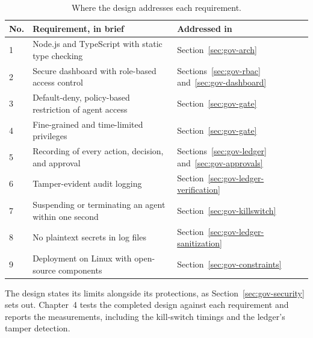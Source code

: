 \begin{table}[htbp]
\centering
\caption{Where the design addresses each requirement.}
\label{tab:gov-requirement-map}
\small
\begin{tabular}{@{}p{}>{\raggedright\arraybackslash}p{}>{\raggedright\arraybackslash}p{}@{}}
\toprule
\textbf{No.} & \textbf{Requirement, in brief} & \textbf{Addressed in} \\
\midrule
1 & Node.js and TypeScript with static type checking &
Section~\ref{sec:gov-arch} \\
2 & Secure dashboard with role-based access control &
Sections~\ref{sec:gov-rbac} and~\ref{sec:gov-dashboard} \\
3 & Default-deny, policy-based restriction of agent access &
Section~\ref{sec:gov-gate} \\
4 & Fine-grained and time-limited privileges & Section~\ref{sec:gov-gate}
\\
5 & Recording of every action, decision, and approval &
Sections~\ref{sec:gov-ledger} and~\ref{sec:gov-approvals} \\
6 & Tamper-evident audit logging &
Section~\ref{sec:gov-ledger-verification} \\
7 & Suspending or terminating an agent within one second &
Section~\ref{sec:gov-killswitch} \\
8 & No plaintext secrets in log files &
Section~\ref{sec:gov-ledger-sanitization} \\
9 & Deployment on Linux with open-source components &
Section~\ref{sec:gov-constraints} \\
\bottomrule
\end{tabular}
\end{table}

The design states its limits alongside its protections, as
Section~\ref{sec:gov-security} sets out. Chapter~4 tests the completed
design against each requirement and reports the measurements, including
the kill-switch timings and the ledger's tamper detection.


